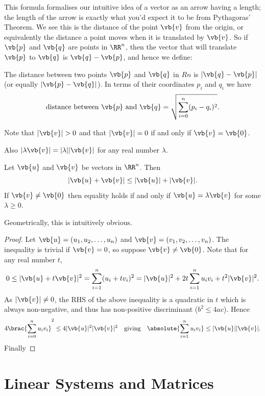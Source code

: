 This formula formalises our intuitive idea of a vector as an arrow having a length; the length of the arrow is exactly what you'd expect it to be from Pythagoras’ Theorem. We see this is the distance of the point $\vb{v}$ from the origin, or equivalently the distance a point moves when it is translated by $\vb{v}$. So if $\vb{p}$ and $\vb{q}$ are points in $\RR^n$, then the vector that will translate $\vb{p}$ to $\vb{q}$ is $\vb{q}-\vb{p}$, and hence we define:

\begin{definition}
The distance between two points $\vb{p}$ and $\vb{q}$ in $Rn$ is $|\vb{q}-\vb{p}|$ (or equally $|\vb{p}-\vb{q}|$). In terms of their coordinates $p_i$ and $q_i$ we have
\[ \text{distance between }\vb{p}\text{ and }\vb{q}=\sqrt{\sum_{i=0}^n(p_i-q_i)^2}. \]
\end{definition}

Note that $|\vb{v}|>0$ and that $|\vb{v}|=0$ if and only if $\vb{v}=\vb{0}$.

Also $|\lambda\vb{v}|=|\lambda||\vb{v}|$ for any real number $\lambda$.

\begin{proposition}
Let $\vb{u}$ and $\vb{v}$ be vectors in $\RR^n$. Then
\begin{equation}
|\vb{u}+\vb{v}|\le|\vb{u}|+|\vb{v}|.
\end{equation}
If $\vb{v}\neq\vb{0}$ then equality holds if and only if $\vb{u}=\lambda\vb{v}$ for some $\lambda\ge0$.
\end{proposition}

Geometrically, this is intuitively obvious.

\begin{proof}
Let $\vb{u}=(u_1,u_2,\dots,u_n)$ and $\vb{v}=(v_1,v_2,\dots,v_n)$. The inequality is trivial if $\vb{v}=0$, so suppose $\vb{v}\neq\vb{0}$. Note that for any real number $t$,
\[ 0\le|\vb{u}+t\vb{v}|^2=\sum_{i=1}^n(u_i+tv_i)^2=|\vb{u}|^2+2t\sum_{i=1}^nu_iv_i+t^2|\vb{v}|^2. \]
As $|\vb{v}|\neq0$, the RHS of the above inequality is a quadratic in $t$ which is always non-negative, and thus has non-positive discriminant ($b^2\le4ac$). Hence
\[ 4\brac{\sum_{i=0}^nu_iv_i}^2\le4|\vb{u}|^2|\vb{v}|^2 \quad \text{giving} \quad \absolute{\sum_{i=1}^nu_iv_i}\le|\vb{u}||\vb{v}|. \]
Finally

\end{proof}

\chapter{Linear Systems and Matrices}
